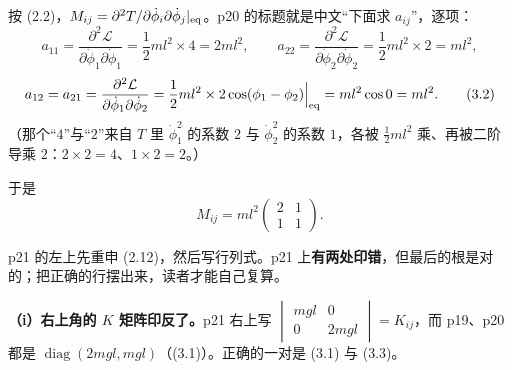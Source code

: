 \documentclass[11pt]{ctexart}
\begin{document}

按 (2.2)，$M_{ij}=\partial^2T/\partial\dot\phi_i\partial\dot\phi_j|_{\rm eq}$。p20 的标题就是中文“下面求 $a_{ij}$”，逐项：
\[
a_{11}=\frac{\partial^2\mathcal{L}}{\partial\dot\phi_1\partial\dot\phi_1}=\frac12ml^2\times4=2ml^2,\qquad
a_{22}=\frac{\partial^2\mathcal{L}}{\partial\dot\phi_2\partial\dot\phi_2}=\frac12ml^2\times2=ml^2,
\]
\[
a_{12}=a_{21}=\frac{\partial^2\mathcal{L}}{\partial\dot\phi_1\partial\dot\phi_2}
=\frac12ml^2\times2\cos(\phi_1-\phi_2)\Big|_{\rm eq}=ml^2\cos0=ml^2 .
\tag{3.2}
\]
（那个“$4$”与“$2$”来自 $T$ 里 $\dot\phi_1^2$ 的系数 $2$ 与 $\dot\phi_2^2$ 的系数 $1$，各被 $\frac12ml^2$ 乘、再被二阶导乘 $2$：$2\times2=4$、$1\times2=2$。）


于是
\[
M_{ij}=ml^2\begin{pmatrix}2&1\\1&1\end{pmatrix}.
\tag{3.3}
\]


p21 的左上先重申 (2.12)，然后写行列式。p21 上\textbf{有两处印错}，但最后的根是对的；把正确的行摆出来，读者才能自己复算。

\textbf{（i）右上角的 $K$ 矩阵印反了。}p21 右上写
$\begin{vmatrix}mgl&0\\0&2mgl\end{vmatrix}=K_{ij}$，而 p19、p20 都是 $\operatorname{diag}(2mgl,mgl)$（(3.1)）。正确的一对是 (3.1) 与 (3.3)。
\end{document}
